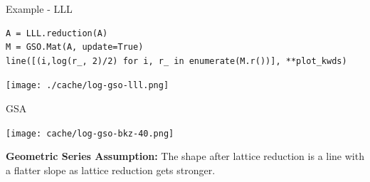 \documentclass[table,10pt,aspectratio=169]{beamer}
\begin{document}
\begin{frame}[label={sec:orgeb966be},fragile]{Example - LLL}
 \lstset{language=Python,label= ,caption= ,captionpos=b,numbers=none}
\begin{lstlisting}
A = LLL.reduction(A)
M = GSO.Mat(A, update=True)
line([(i,log(r_, 2)/2) for i, r_ in enumerate(M.r())], **plot_kwds)
\end{lstlisting}

\begin{center}
\texttt{[image: ./cache/log-gso-lll.png]}
\end{center}
\end{frame}

\begin{frame}[label={sec:orgfaeec74}]{GSA}
\begin{center}
\texttt{[image: cache/log-gso-bkz-40.png]}
\end{center}

\textbf{Geometric Series Assumption:} The shape after lattice reduction is a line with a flatter slope as lattice reduction gets stronger.
\end{frame}
\end{document}
